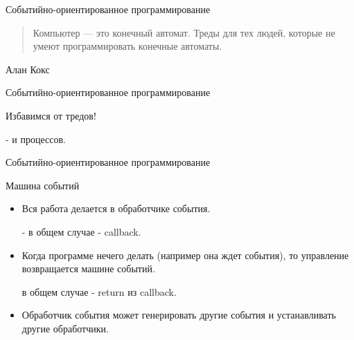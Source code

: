 \documentclass[aspectratio=169]{beamer}
\begin{document}
\begin{frame}{Событийно-ориентированное программирование}

    \begin{quote}
    Компьютер — это конечный автомат.
        Треды для тех людей, которые не умеют
        программировать конечные автоматы.
    \end{quote}
    \begin{center}
        \begin{uncoverenv}
        Алан Кокс
        \end{uncoverenv}
    \end{center}

\end{frame}

\begin{frame}{Событийно-ориентированное программирование}
    \begin{block}
        {\huge Избавимся от тредов!}
        \pause\par - {\small и процессов.}
    \end{block}
\end{frame}

\begin{frame}{Событийно-ориентированное программирование}
    \begin{block}{Машина событий}
        \begin{itemize}

            \pause\item Вся работа делается в обработчике события.
                \pause\par - в общем случае - callback.

            \pause\item Когда программе нечего делать (например
                она ждет события), то управление возвращается
                машине событий.
                    \pause\par в общем случае - return из callback.

            \pause\item Обработчик события может генерировать другие события и
                устанавливать другие обработчики.
        \end{itemize}
    \end{block}
\end{frame}
\end{document}
